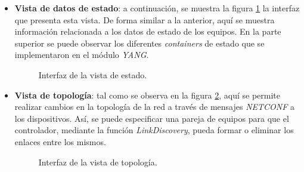 \begin{itemize}
    \item \textbf{Vista de datos de estado}: a continuación, se muestra la figura \ref{fig:captura_web_estado} la interfaz que presenta esta vista. De forma similar a la anterior, aquí se muestra información relacionada a los datos de estado de los equipos. En la parte superior se puede observar los diferentes \textit{containers} de estado que se implementaron en el módulo \textit{YANG}.  
    
    \begin{figure}[H]
        \centering
        \caption{Interfaz de la vista de estado.}
        \label{fig:captura_web_estado}
      \end{figure}

    \item \textbf{Vista de topología}: tal como se observa en la figura \ref{fig:captura_web_topo}, aquí se permite realizar cambios en la topología de la red a través de mensajes \textit{NETCONF} a los dispositivos. Así, se puede especificar una pareja de equipos para que el controlador, mediante la función \textit{LinkDiscovery}, pueda formar o eliminar los enlaces entre los mismos.
    
    \begin{figure}[H]
        \centering
        \caption{Interfaz de la vista de topología.}
        \label{fig:captura_web_topo}
      \end{figure}
    

\end{itemize}
